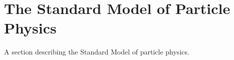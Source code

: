 \chapter{The Standard Model of Particle Physics}
\label{sm}

A section describing the Standard Model of particle physics.
